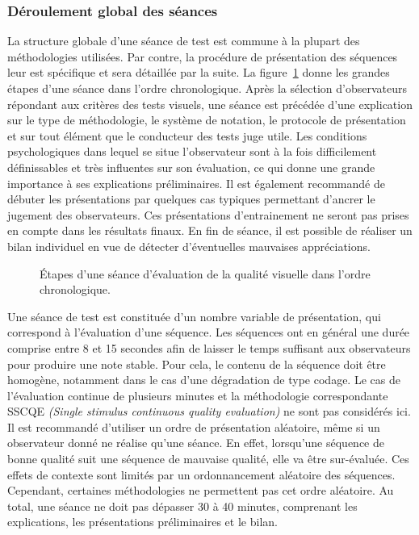 \subsubsection{Déroulement global des séances}
La structure globale d'une séance de test est commune à la plupart des méthodologies utilisées. Par contre, la procédure de présentation des séquences leur est spécifique et sera détaillée par la suite. La figure~\ref{fig:seance} donne les grandes étapes d'une séance dans l'ordre chronologique. Après la sélection d'observateurs répondant aux critères des tests visuels, une séance est précédée d'une explication sur le type de méthodologie, le système de notation, le protocole de présentation et sur tout élément que le conducteur des tests juge utile. Les conditions psychologiques dans lequel se situe l'observateur sont à la fois difficilement définissables et très influentes sur son évaluation, ce qui donne une grande importance à ses explications préliminaires. Il est également recommandé de débuter les présentations par quelques cas typiques permettant d'ancrer le jugement des observateurs. Ces présentations d'entrainement ne seront pas prises en compte dans les résultats finaux. En fin de séance, il est possible de réaliser un bilan individuel en vue de détecter d'éventuelles mauvaises appréciations.

\begin{figure}[htbp]
	\centering
	\begin{tikzpicture}[thick, text width=2cm,minimum height=1.2cm]\end{tikzpicture}
	\caption{Étapes d'une séance d'évaluation de la qualité visuelle dans l'ordre chronologique.}
	\label{fig:seance}
\end{figure}

Une séance de test est constituée d'un nombre variable de présentation, qui correspond à l'évaluation d'une séquence. Les séquences ont en général une durée comprise entre 8 et 15 secondes afin de laisser le temps suffisant aux observateurs pour produire une note stable. Pour cela, le contenu de la séquence doit être homogène, notamment dans le cas d'une dégradation de type codage. Le cas de l'évaluation continue de plusieurs minutes et la méthodologie correspondante SSCQE \emph{(Single stimulus continuous quality evaluation)} ne sont pas considérés ici. Il est recommandé d'utiliser un ordre de présentation aléatoire, même si un observateur donné ne réalise qu'une séance. En effet, lorsqu'une séquence de bonne qualité suit une séquence de mauvaise qualité, elle va être sur-évaluée. Ces effets de contexte sont limités par un ordonnancement aléatoire des séquences. Cependant, certaines méthodologies ne permettent pas cet ordre aléatoire. Au total, une séance ne doit pas dépasser 30 à 40 minutes,  comprenant les explications, les présentations préliminaires et le bilan.


